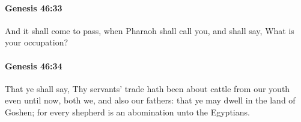 		\paragraph{Genesis 46:33} %
			\label{GENESIS-46-33}

			And it shall come to pass, when Pharaoh shall call you, and shall say, What is your occupation?


		\paragraph{Genesis 46:34} %
			\label{GENESIS-46-34}

			That ye shall say, Thy servants' trade hath been about cattle from our youth even until now, both we, and also our fathers: that ye may dwell in the land of Goshen; for every shepherd is an abomination unto the Egyptians.

